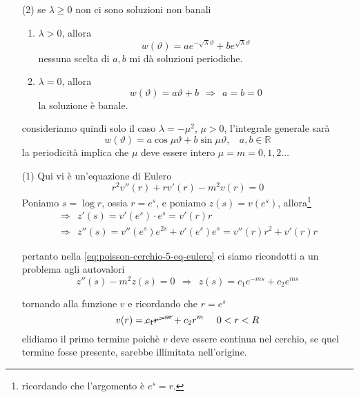 \documentclass[10pt,a4paper,twoside,openright]{book}
\begin{document}
\begin{dimostrazione}
\begin{enumerate}
\item [(2)] se $\lambda \geqslant 0$ non ci sono soluzioni non banali
\begin{enumerate}
\item $\lambda  >0$, allora\begin{equation*}
w(\vartheta) =ae^{-\sqrt{\lambda } \vartheta } +be^{\sqrt{\lambda } \vartheta }
\end{equation*}nessuna scelta di $a,b$ mi dà soluzioni periodiche.
\item $\lambda =0$, allora\begin{equation*}
w(\vartheta) =a\vartheta +b\ \ \Rightarrow \ \ a=b=0
\end{equation*}la soluzione è banale.
\end{enumerate}

consideriamo quindi solo il caso $\lambda =-\mu ^{2}$, $\mu  >0$, l'integrale generale sarà\begin{equation*}
w(\vartheta) =a\cos \mu \vartheta +b\sin \mu \vartheta,\ \ \ \ a,b\in \mathbb{R}
\end{equation*}la periodicità implica che $\mu $ deve essere intero $\mu =m=0,1,2\dotsc $
\item [(1)] Qui vi è un'equazione di Eulero
\begin{equation}
r^{2} v''(r) +rv'(r) -m^{2} v(r) =0
\label{eq:poisson-cerchio-5-eq-eulero}
\end{equation}
Poniamo $s=\log r$, ossia $r=e^{s}$, e poniamo $z(s) =v\left(e^{s}\right)$, allora\footnote{ricordando che l'argomento è $e^{s} =r$.}\begin{equation*}
\begin{array}{ l }
\Rightarrow \ \ z'(s) =v'\left(e^{s}\right) \cdotp e^{s} =v'(r) r\\
\Rightarrow \ \ z''(s) =v''\left(e^{s}\right) e^{2s} +v'\left(e^{s}\right) e^{s} =v''(r) r^{2} +v'(r) r
\end{array}
\end{equation*}

pertanto nella \eqref{eq:poisson-cerchio-5-eq-eulero} ci siamo ricondotti a un problema agli autovalori\begin{equation*}
z''(s) -m^{2} z(s) =0\ \ \Rightarrow \ \ z(s) =c_{1} e^{-ms} +c_{2} e^{ms}
\end{equation*}

tornando alla funzione $v$ e ricordando che $r=e^{s}$\begin{equation*}
v(r) =\cancel{c_{1} r^{-m}} +c_{2} r^{m} \ \ \ \ 0< r< R
\end{equation*}elidiamo il primo termine poichè $v$ deve essere continua nel cerchio, se quel termine fosse presente, sarebbe illimitata nell'origine.
\end{enumerate}


\end{dimostrazione}
\end{document}

